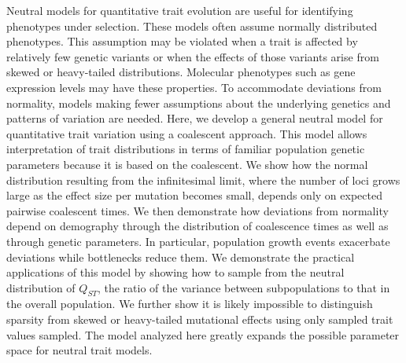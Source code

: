 Neutral models for quantitative trait evolution are useful for identifying
phenotypes under selection. These models often assume normally distributed
phenotypes. This assumption may be violated when a trait is affected by
relatively few genetic variants or when the effects of those variants arise from
skewed or heavy-tailed distributions. Molecular phenotypes such as gene
expression levels may have these properties. To accommodate deviations from
normality, models making fewer assumptions about the underlying genetics and
patterns of variation are needed. Here, we develop a general neutral model for
quantitative trait variation using a coalescent approach. This model allows
interpretation of trait distributions in terms of familiar population genetic
parameters because it is based on the coalescent. We show how the normal
distribution resulting from the infinitesimal limit, where the number of loci
grows large as the effect size per mutation becomes small, depends only on
expected pairwise coalescent times. We then demonstrate how deviations from
normality depend on demography through the distribution of coalescence times as
well as through genetic parameters. In particular, population growth events
exacerbate deviations while bottlenecks reduce them. We demonstrate the
practical applications of this model by showing how to sample from the neutral
distribution of $Q_{ST}$, the ratio of the variance between subpopulations to
that in the overall population. We further show it is likely impossible to
distinguish sparsity from skewed or heavy-tailed mutational effects using only
sampled trait values sampled. The model analyzed here greatly expands the
possible parameter space for neutral trait models.

